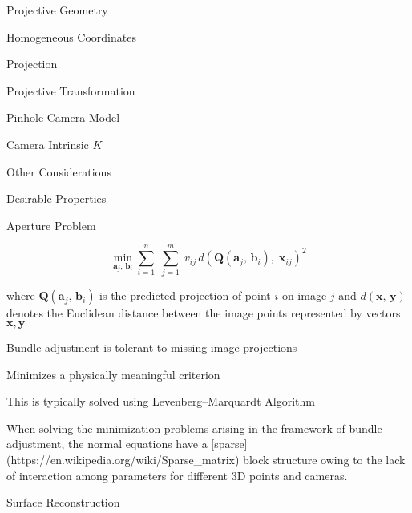 \begin{section}
\begin{subsubsection}
\begin{subsubsection}
\begin{subsubsection}
\begin{section}{Projective Geometry}
\begin{subsection}{Homogeneous Coordinates}
\begin{subsubsection}
{\begin{subsubsection}{Projection}
\begin{subsubsection}{Projective Transformation}
\begin{subsection}
\begin{subsubsection}
\begin{subsubsection}
\begin{subsubsection}
{\begin{subsubsection}
\begin{subsection}
\begin{subsection} {Pinhole Camera Model}
\begin{subsection} {Camera Intrinsic $K$}
\begin{subsection}
\begin{subsection}
\begin{subsubsection}{Other Considerations}
{\begin{subsection}
\begin{subsubsection}{Desirable Properties}
\begin{section}
\begin{subsection}
\begin{subsection}
\begin{subsection}
\begin{section}
\begin{subsection}
\begin{subsubsection}
\begin{subsubsection}
\begin{subsection}
\begin{section}
\begin{subsection}
\begin{subsubsection}{Aperture Problem}
\begin{subsubsection}
{\begin{section}
\begin{subsubsection}
\begin{subsubsection}
\begin{subsubsection}
\begin{subsection}
\begin{subsection}
\begin{subsection}
\begin{subsection}
\begin{subsection}
\begin{subsection}
\begin{subsection}
$$\min _{{{\mathbf  {a}}_{j},\,{\mathbf  {b}}_{i}}}\displaystyle \sum _{{i=1}}^{{n}}\;\displaystyle \sum _{{j=1}}^{{m}}\;v_{{ij}}\,d({\mathbf  {Q}}({\mathbf  {a}}_{j},\,{\mathbf  {b}}_{i}),\;{\mathbf{x}}_{{ij}})^{2}$$

where $\mathbf {Q} (\mathbf {a} _{j},\,\mathbf {b} _{i})$ is the predicted projection of point $i$ on image $j$ and $d(\mathbf {x} ,\,\mathbf {y} )$  denotes the Euclidean distance between the image points represented by vectors $\mathbf{x,y}$

Bundle adjustment is tolerant to missing image projections 

Minimizes a physically meaningful criterion

This is typically solved using Levenberg–Marquardt Algorithm

When solving the minimization problems arising in the framework of bundle adjustment, the normal equations have a [sparse](https://en.wikipedia.org/wiki/Sparse_matrix) block structure owing to the lack of interaction among parameters for different 3D points and cameras.

\begin{subsubsection} Surface Reconstruction


\end{subsubsection}
\end{subsection}
\end{subsection}
\end{subsection}
\end{subsection}
\end{subsection}
\end{subsection}
\end{subsection}
\end{subsubsection}
\end{subsubsection}
\end{subsubsection}
\end{section}}
\end{subsubsection}
\end{subsubsection}
\end{subsection}
\end{section}
\end{subsection}
\end{subsubsection}
\end{subsubsection}
\end{subsection}
\end{section}
\end{subsection}
\end{subsection}
\end{subsection}
\end{section}
\end{subsubsection}
\end{subsection}}
\end{subsubsection}
\end{subsection}
\end{subsection}
\end{subsection}
\end{subsection}
\end{subsection}
\end{subsubsection}}
\end{subsubsection}
\end{subsubsection}
\end{subsubsection}
\end{subsection}
\end{subsubsection}
\end{subsubsection}}
\end{subsubsection}
\end{subsection}
\end{section}
\end{subsubsection}
\end{subsubsection}
\end{subsubsection}
\end{section}
